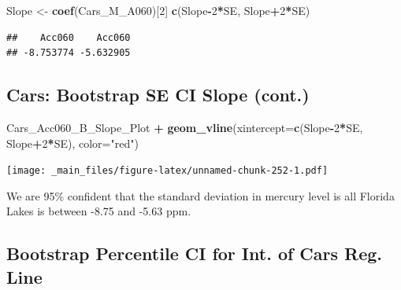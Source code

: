 \documentclass[]{book}
\newenvironment{Shaded}{\begin{snugshade}}{\end{snugshade}}
\newcommand{\KeywordTok}[1]{\textcolor[rgb]{0.13,0.29,0.53}{\textbf{#1}}}
\newcommand{\DataTypeTok}[1]{\textcolor[rgb]{0.13,0.29,0.53}{#1}}
\newcommand{\DecValTok}[1]{\textcolor[rgb]{0.00,0.00,0.81}{#1}}
\newcommand{\FloatTok}[1]{\textcolor[rgb]{0.00,0.00,0.81}{#1}}
\newcommand{\StringTok}[1]{\textcolor[rgb]{0.31,0.60,0.02}{#1}}
\newcommand{\OperatorTok}[1]{\textcolor[rgb]{0.81,0.36,0.00}{\textbf{#1}}}
\newcommand{\NormalTok}[1]{#1}
\begin{document}
\begin{Shaded}
\begin{Highlighting}[]
\NormalTok{Slope <-}\StringTok{ }\KeywordTok{coef}\NormalTok{(Cars_M_A060)[}\DecValTok{2}\NormalTok{]}
\KeywordTok{c}\NormalTok{(Slope}\OperatorTok{-}\DecValTok{2}\OperatorTok{*}\NormalTok{SE, Slope}\OperatorTok{+}\DecValTok{2}\OperatorTok{*}\NormalTok{SE)}
\end{Highlighting}
\end{Shaded}

\begin{verbatim}
##    Acc060    Acc060 
## -8.753774 -5.632905
\end{verbatim}

\subsection{Cars: Bootstrap SE CI Slope
(cont.)}\label{cars-bootstrap-se-ci-slope-cont.}

\begin{Shaded}
\begin{Highlighting}[]
\NormalTok{Cars_Acc060_B_Slope_Plot  }\OperatorTok{+}\StringTok{ }\KeywordTok{geom_vline}\NormalTok{(}\DataTypeTok{xintercept=}\KeywordTok{c}\NormalTok{(Slope}\OperatorTok{-}\DecValTok{2}\OperatorTok{*}\NormalTok{SE, Slope}\OperatorTok{+}\DecValTok{2}\OperatorTok{*}\NormalTok{SE), }\DataTypeTok{color=}\StringTok{"red"}\NormalTok{) }
\end{Highlighting}
\end{Shaded}

\texttt{[image: \_main\_files/figure-latex/unnamed-chunk-252-1.pdf]}

We are 95\% confident that the standard deviation in mercury level is
all Florida Lakes is between -8.75 and -5.63 ppm.

\subsection{Bootstrap Percentile CI for Int. of Cars Reg.
Line}\label{bootstrap-percentile-ci-for-int.-of-cars-reg.-line}

\begin{Shaded}
\end{Shaded}
\end{document}
